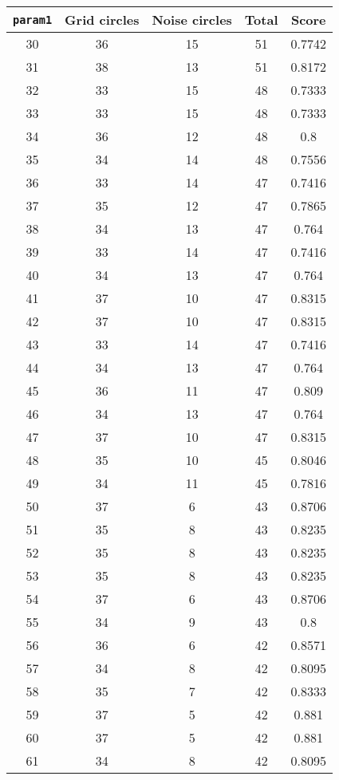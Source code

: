 \documentclass[letterpaper, 12pt]{article}
\begin{document}
\begin{longtable}{|c|c|c|c|c|}
\hline
\textbf{\texttt{param1}} & \textbf{Grid circles} & \textbf{Noise circles} & \textbf{Total} & \textbf{Score} \\
\hline
30 & 36 & 15 & 51 & 0.7742 \\
\hline
31 & 38 & 13 & 51 & 0.8172 \\
\hline
32 & 33 & 15 & 48 & 0.7333 \\
\hline
33 & 33 & 15 & 48 & 0.7333 \\
\hline
34 & 36 & 12 & 48 & 0.8 \\
\hline
35 & 34 & 14 & 48 & 0.7556 \\
\hline
36 & 33 & 14 & 47 & 0.7416 \\
\hline
37 & 35 & 12 & 47 & 0.7865 \\
\hline
38 & 34 & 13 & 47 & 0.764 \\
\hline
39 & 33 & 14 & 47 & 0.7416 \\
\hline
40 & 34 & 13 & 47 & 0.764 \\
\hline
41 & 37 & 10 & 47 & 0.8315 \\
\hline
42 & 37 & 10 & 47 & 0.8315 \\
\hline
43 & 33 & 14 & 47 & 0.7416 \\
\hline
44 & 34 & 13 & 47 & 0.764 \\
\hline
45 & 36 & 11 & 47 & 0.809 \\
\hline
46 & 34 & 13 & 47 & 0.764 \\
\hline
47 & 37 & 10 & 47 & 0.8315 \\
\hline
48 & 35 & 10 & 45 & 0.8046 \\
\hline
49 & 34 & 11 & 45 & 0.7816 \\
\hline
50 & 37 & 6 & 43 & 0.8706 \\
\hline
51 & 35 & 8 & 43 & 0.8235 \\
\hline
52 & 35 & 8 & 43 & 0.8235 \\
\hline
53 & 35 & 8 & 43 & 0.8235 \\
\hline
54 & 37 & 6 & 43 & 0.8706 \\
\hline
55 & 34 & 9 & 43 & 0.8 \\
\hline
56 & 36 & 6 & 42 & 0.8571 \\
\hline
57 & 34 & 8 & 42 & 0.8095 \\
\hline
58 & 35 & 7 & 42 & 0.8333 \\
\hline
59 & 37 & 5 & 42 & 0.881 \\
\hline
60 & 37 & 5 & 42 & 0.881 \\
\hline
61 & 34 & 8 & 42 & 0.8095 \\

\end{longtable}
\end{document}
